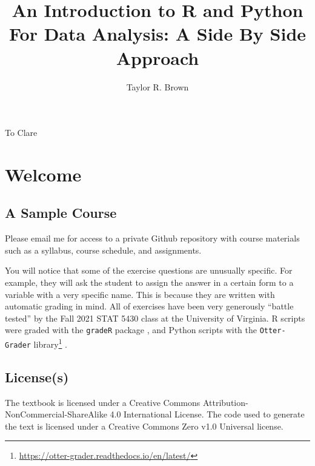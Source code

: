 \documentclass[
  12pt,
]{krantz}
\title{An Introduction to R and Python For Data Analysis: A Side By Side Approach}
\author{Taylor R. Brown}
\date{}
\renewcommand{\href}[2]{#2\footnote{\url{#1}}}
\begin{document}
\maketitle


\thispagestyle{empty}

\begin{center}
To Clare
\end{center}

\setlength{\abovedisplayskip}{-5pt}
\setlength{\abovedisplayshortskip}{-5pt}

{
\setcounter{tocdepth}{2}
\tableofcontents
}
\listoftables
\listoffigures
\hypertarget{welcome}{%
\chapter*{Welcome}\label{welcome}}


\hypertarget{a-sample-course}{%
\section*{A Sample Course}\label{a-sample-course}}


Please email me for access to a private Github repository with course materials such as a syllabus, course schedule, and assignments.

You will notice that some of the exercise questions are unusually specific. For example, they will ask the student to assign the answer in a certain form to a variable with a very specific name. This is because they are written with automatic grading in mind. All of exercises have been very generously ``battle tested'' by the Fall 2021 STAT 5430 class at the University of Virginia. R scripts were graded with the \texttt{gradeR} package \citep{gradeR}, and Python scripts with the \href{https://otter-grader.readthedocs.io/en/latest/}{\texttt{Otter-Grader} library} \citep{otter}.

\hypertarget{licenses}{%
\section*{License(s)}\label{licenses}}


The textbook is licensed under a Creative Commons Attribution-NonCommercial-ShareAlike 4.0 International License. The code used to generate the text is licensed under a Creative Commons Zero v1.0 Universal license.
\end{document}
